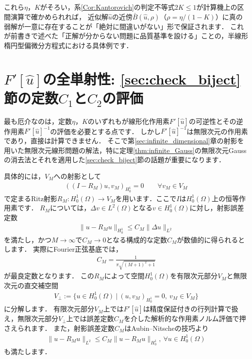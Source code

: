 これら$\eta$，$K$がそろい，系\ref{Cor:Kantorovich}の判定不等式$2K \le 1$が計算機上の区間演算で確かめられれば，
近似解$\hat{u}$の近傍$\bar{B}(\hat{u}, \rho)$（$\rho = \eta / (1-K)$）に真の弱解が一意に存在することが「絶対に間違いがない」形で保証されます．
これが前書きで述べた「正解が分からない問題に品質基準を設ける」ことの，半線形楕円型偏微分方程式における具体例です．



\section*{$F'[\hat{u}]$の全単射性: \ref{sec:check_biject}節の定数$C_1$と$C_2$の評価}

最も厄介なのは，定数$\eta$，$K$のいずれもが線形化作用素$F'[\hat{u}]$の可逆性とその逆作用素$F'[\hat{u}]^{-1}$の評価を必要とする点です．
しかし$F'[\hat{u}]^{-1}$は無限次元の作用素であり，直接は計算できません．
そこで第\ref{sec:infinite_dimensional}章の射影を用いた無限次元線形問題の解法，特に定理\ref{thm:infinite_Gauss}の無限次元Gaussの消去法とそれを適用した\ref{sec:check_biject}節の話題が重要になります．

具体的には，$V_M$への射影として
\begin{align*}
	((I - R_M) u, v_M)_{H_0^1} = 0 \qquad \forall v_M \in V_M
\end{align*}
で定まるRitz射影$R_M : H_0^1(\Omega) \to V_M$を用います．ここで$I$は$H_0^1(\Omega)$上の恒等作用素です．
$R_M$については，$\Delta v \in L^2(\Omega)$となる$v \in H_0^1(\Omega)$に対し，射影誤差定数
\begin{align}
	\| u - R_M u \|_{H_0^1} \le C_M \| \Delta u \|_{L^2}
	\label{eq:afterword_ritz}
\end{align}
を満たし，かつ$M \to \infty$で$C_M \to 0$となる構成的な定数$C_M$が数値的に得られるとします．
実際にFourier正弦基底では，
\begin{align}
	C_M = \frac{1}{\pi \sqrt{ (M+1)^2 + 1 }}
\end{align}
が最良定数となります．
この$R_M$によって空間$H_0^1(\Omega)$を有限次元部分$V_M$と無限次元の直交補空間
\begin{align*}
	V_\perp := \{ u \in H_0^1(\Omega) ~|~ (u, v_M)_{H_0^1} = 0,~ v_M \in V_M \}
\end{align*}
に分解します．
有限次元部分$V_M$上では$F'[\hat{u}]$は精度保証付きの行列計算で扱え，無限次元部分$V_\perp$上では誤差定数$C_M$を介した解析的な作用素ノルム評価で押さえられます．
また，射影誤差定数$C_M$はAubin–Nitscheの技巧より
\begin{align*}
	\| u - R_M u \|_{L^2} \le C_M \| u - R_M u \|_{H^1_0}, ~ \forall u \in H^1_0(\Omega)
\end{align*}
も満たします．

